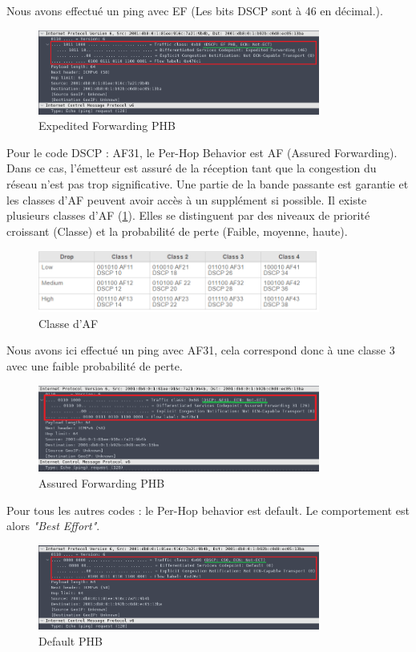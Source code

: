     Nous avons effectué un ping avec EF (Les bits DSCP sont à 46 en décimal.).
        \begin{figure}[h]
        \includegraphics[width=350px]{figures/dscp-ef-color.png}
        \centering
        \caption{Expedited Forwarding PHB}
        \end{figure}
        
	Pour le code DSCP : AF31, le Per-Hop Behavior est AF (Assured Forwarding).
    Dans ce cas, l'émetteur est assuré de la réception tant que la congestion du réseau n'est pas trop significative. Une partie de la bande passante est garantie et les classes d'AF peuvent avoir accès à un supplément si possible. Il existe plusieurs classes d'AF (\ref{af_class}). Elles se distinguent par des niveaux de priorité croissant (Classe) et la probabilité de perte (Faible, moyenne, haute).
        \begin{figure}[h]
        \includegraphics[width=350px]{figures/dscp_af-class.PNG}
        \centering
        \caption{Classe d'AF}
        \label{af_class}
        \end{figure}
\newpage        
        Nous avons ici effectué un ping avec AF31, cela correspond donc à une classe 3 avec une faible probabilité de perte.
        \begin{figure}[h]
        \includegraphics[width=350px]{figures/dscp-af-color.png}
        \centering
        \caption{Assured Forwarding PHB}
        \end{figure}
        
       
    Pour tous les autres codes : le Per-Hop behavior est default. Le comportement est alors \textit{"Best Effort"}.
		\begin{figure}[h]
        \includegraphics[width=350px]{figures/dscp-dflt-color.png}
        \centering
        \caption{Default PHB}
        \end{figure}
        
